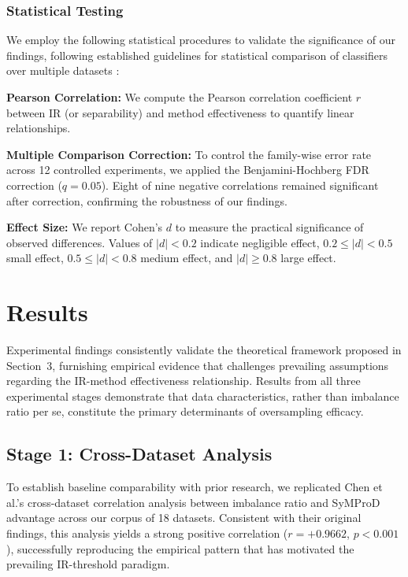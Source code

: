 \documentclass{ijSmartGrid}
\theoremstyle{definition}
\begin{document}
\subsubsection{Statistical Testing}
\indent We employ the following statistical procedures to validate the significance of our findings, following established guidelines for statistical comparison of classifiers over multiple datasets \cite{demsar2006statistical,benavoli2016should,garcia2008extension}:

\textbf{Pearson Correlation:} We compute the Pearson correlation coefficient $r$ between IR (or separability) and method effectiveness to quantify linear relationships.

\textbf{Multiple Comparison Correction:} To control the family-wise error rate across 12 controlled experiments, we applied the Benjamini-Hochberg FDR correction ($q = 0.05$). Eight of nine negative correlations remained significant after correction, confirming the robustness of our findings.

\textbf{Effect Size:} We report Cohen's $d$ to measure the practical significance of observed differences. Values of $|d| < 0.2$ indicate negligible effect, $0.2 \leq |d| < 0.5$ small effect, $0.5 \leq |d| < 0.8$ medium effect, and $|d| \geq 0.8$ large effect.

\section{Results}
\indent Experimental findings consistently validate the theoretical framework proposed in Section~3, furnishing empirical evidence that challenges prevailing assumptions regarding the IR-method effectiveness relationship. Results from all three experimental stages demonstrate that data characteristics, rather than imbalance ratio per se, constitute the primary determinants of oversampling efficacy.

\subsection{Stage 1: Cross-Dataset Analysis}
\indent To establish baseline comparability with prior research, we replicated Chen et al.'s \cite{chen2023syMProD} cross-dataset correlation analysis between imbalance ratio and SyMProD advantage across our corpus of 18 datasets. Consistent with their original findings, this analysis yields a strong positive correlation ($r = +0.9662$, $p < 0.001$), successfully reproducing the empirical pattern that has motivated the prevailing IR-threshold paradigm.
\end{document}
